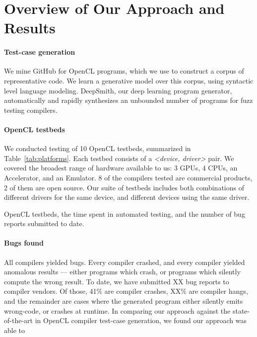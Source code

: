 \section{Overview of Our Approach and Results}\label{sec:overview}

\paragraph{Test-case generation} We mine GitHub for OpenCL programs, which we use to construct a corpus of representative code. We learn a generative model over this corpus, using syntactic level language modeling. DeepSmith, our deep learning program generator, automatically and rapidly synthesizes an unbounded number of programs for fuzz testing compilers.

\paragraph{OpenCL testbeds} We conducted testing of 10 OpenCL testbeds, summarized in Table~\ref{tab:platforms}. Each testbed consists of a \emph{<device, driver>} pair. We covered the broadest range of hardware available to us: 3 GPUs, 4 CPUs, an Accelerator, and an Emulator. 8 of the compilers tested are commercial products, 2 of them are open source. Our suite of testbeds includes both combinations of different drivers for the same device, and different devices using the same driver.


\begin{table*}[t!]
	\scriptsize %
	\centering %
	
	\caption{OpenCL testbeds, the time spent in automated testing, and the number of bug reports submitted to date.}
	\label{tab:platforms}
\end{table*}


\paragraph{Bugs found} All compilers yielded bugs. Every compiler crashed, and every compiler yielded anomalous results --- either programs which crash, or programs which silently compute the wrong result. To date, we have submitted XX bug reports to compiler vendors. Of those, 41\% are compiler crashes, XX\% are compiler hangs, and the remainder are cases where the generated program either silently emits wrong-code, or crashes at runtime. In comparing our approach against the state-of-the-art in OpenCL compiler test-case generation, we found our approach was able to \cc{\ldots}